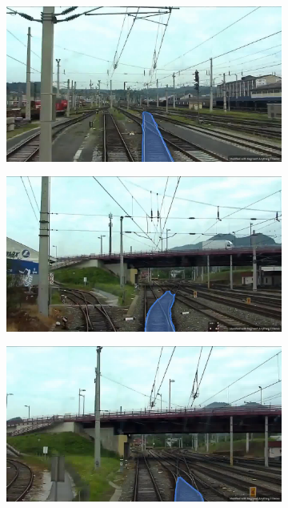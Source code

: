 \begin{figure}[H]
    \centering
    \begin{subfigure}{0.328\textwidth}
        \centering
        \includegraphics[width=\linewidth]{PICs/discussion/segmentanything2_weicheWeiter.jpg}
        \caption{}
        \label{fig:segmentanything2_a}
    \end{subfigure}
    \hfill
    \begin{subfigure}{0.328\textwidth}
        \centering
        \includegraphics[width=\linewidth]{PICs/discussion/segmentanything2_weicheWeg.jpg}
        \caption{}
        \label{fig:segmentanything2_b}
    \end{subfigure}
    \begin{subfigure}{0.328\textwidth}
        \centering
        \includegraphics[width=\linewidth]{PICs/discussion/segmentanything2_weicheWeg2.jpg}

\end{subfigure}
\end{figure}
